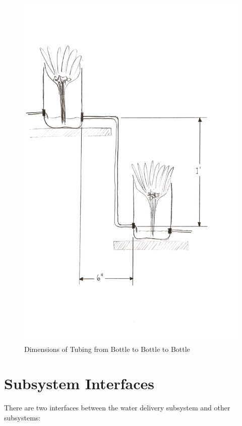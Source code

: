 \documentclass[12pt]{article}
\begin{document}
\pagebreak
\begin{figure}[H]
    \centering
    \includegraphics[width=135mm]{resources/tubing-bottle-to-bottle.png}
    \caption{Dimensions of Tubing from Bottle to Bottle to Bottle}
\end{figure}

\section{Subsystem Interfaces}

There are two interfaces between the water delivery subsystem and other subsystems:
\end{document}
